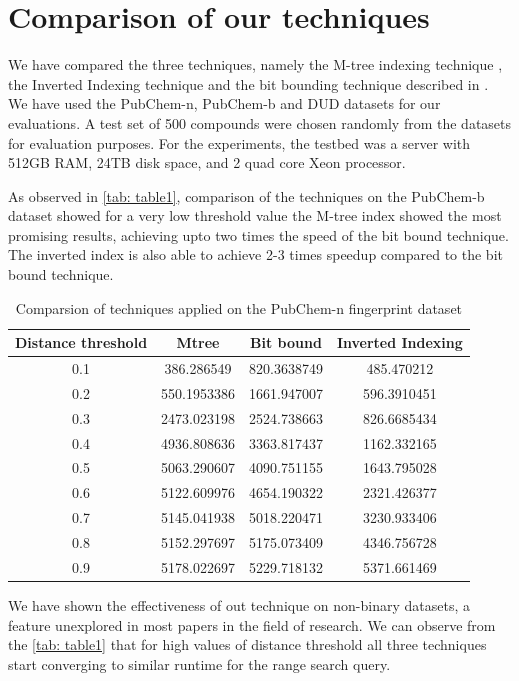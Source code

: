 \section{Comparison of our techniques}

We have compared the three techniques, namely the M-tree indexing technique , the Inverted Indexing technique and the bit bounding technique described in \citet*{swamidass2007bounds}. We have used the PubChem-n, PubChem-b and DUD datasets for our evaluations. A test set of 500 compounds were chosen randomly from the datasets for evaluation purposes. For the experiments, the testbed was a server with 512GB RAM, 24TB disk space, and 2 quad core Xeon processor. 

As observed in \autoref{tab: table1}, comparison of the techniques on the PubChem-b dataset showed for a very low threshold value the M-tree index showed the most promising results, achieving upto two times the speed of the bit bound technique. The inverted index is also able to achieve 2-3 times speedup compared to the bit bound technique. \\



\begin{table}[ht]
\centering
\caption{Comparsion of techniques applied on the PubChem-n fingerprint dataset}
\label{tab: table1}
\begin{tabular}{|c|c|c|c|}
\hline 
Distance threshold & Mtree	& Bit bound	& 	Inverted Indexing \\
\hline
0.1	& 	386.286549	& 820.3638749	&	485.470212\\
0.2	& 	550.1953386	& 1661.947007	&	596.3910451\\
0.3	& 	2473.023198	& 2524.738663	&	826.6685434\\
0.4	& 	4936.808636	& 3363.817437	&	1162.332165\\
0.5	& 	5063.290607	& 4090.751155	&	1643.795028\\
0.6	& 	5122.609976	& 4654.190322	&	2321.426377\\
0.7	& 	5145.041938	& 5018.220471	&	3230.933406\\
0.8	& 	5152.297697	& 5175.073409	&	4346.756728\\
0.9	& 	5178.022697	& 5229.718132	&	5371.661469\\
\hline 
\end{tabular} 
\end{table}

We have shown the effectiveness of out technique on non-binary datasets, a feature unexplored in most papers in the field of research. We can observe from the \autoref{tab: table1} that for high values of distance threshold all three techniques start converging to similar runtime for the range search query. \\

